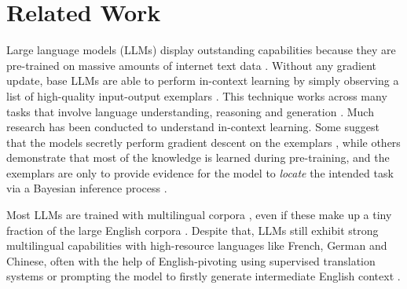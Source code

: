 \section{Related Work}\label{sec:rel_works}

\makeatletter


Large language models (LLMs) display outstanding capabilities because they are pre-trained on massive amounts of internet text data \citep{gpt3_brown2020language,palm_chowdhery2022palm,bloom_scao2022bloom,llama_touvron2023,llama2_touvron2023llama}. Without any gradient update, base LLMs are able to perform in-context learning by simply observing a list of high-quality input-output exemplars \citep{gpt3_brown2020language,llm_do_icl_differently_wei2023larger}. This technique works across many tasks that involve language understanding, reasoning and generation \citep{gpt3_brown2020language,cot_wei2022chain,llm_are_mling_cot_shi2022language}. Much research has been conducted to understand in-context learning. Some suggest that the models secretly perform gradient descent on the exemplars \citep{icl_gradient_descen_dai2022can}, while others demonstrate that most of the knowledge is learned during pre-training, and the exemplars are only to provide evidence for the model to \textit{locate} the intended task via a Bayesian inference process \citep{icl_bayesian_infer_xie2021explanation,rethink_demonstration_min2022rethinking,lima_zhou2023lima}.

Most LLMs are trained with multilingual corpora \citep{ccnet_wenzek-etal-2020-ccnet}, even if these make up a tiny fraction of the large English corpora \citep{gpt2_radford2019language_gpt2,gpt3_brown2020language}. Despite that, LLMs still exhibit strong multilingual capabilities with high-resource languages like French, German and Chinese, often with the help of English-pivoting using supervised translation systems \citep{llm_are_mling_cot_shi2022language} or prompting the model to firstly generate intermediate English context \citep{xlt_not_all_created_equal_huang2023not}. 

